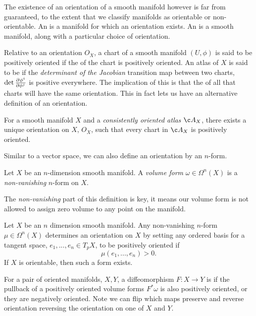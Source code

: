 The existence of an orientation of a smooth manifold however is far from guaranteed, to the extent that we classify manifolds as orientable or non-orientable.
An  is a manifold for which an orientation exists.
An  is a smooth manifold, along with a particular choice of orientation.

Relative to an orientation \(O_X\), a chart of a smooth manifold \((U, \phi)\) is said to be positively oriented if the  of the chart is positively oriented.
An atlas of \(X\) is said to be  if the \emph{determinant of the Jacobian} transition map between two charts, \(\det \pd{\phi^i}{\phi^j}\) is positive everywhere.
The implication of this is that the  of all that charts will have the same orientation.
This in fact lets us have an alternative definition of an orientation.
\begin{proposition}
	For a smooth manifold \(X\) and a \emph{consistently oriented atlas} \(\atlas{X}\), there exists a unique orientation on \(X\), \(O_X\), such that every chart in \(\atlas{X}\) is positively oriented.
\end{proposition}

Similar to a vector space, we can also define an orientation by an \(n\)-form.
\begin{definition}
	\label{def:volume_form}
	Let \(X\) be an \(n\)-dimension smooth manifold.
	A \emph{volume form} \(\omega\in \Omega^n(X)\) is a \emph{non-vanishing} \(n\)-form on \(X\).
\end{definition}
The \emph{non-vanishing} part of this definition is key, it means our volume form is not allowed to assign zero volume to any point on the manifold.
\begin{proposition}
	Let \(X\) be an \(n\) dimension smooth manifold.
	Any non-vanishing \(n\)-form \(\mu \in \Omega^n(X)\) determines an orientation on \(X\) by setting any ordered basis for a tangent space, \(e_1, ..., e_n \in T_pX\), to be positively oriented if \[\mu(e_1, ..., e_n) > 0.\]
	If \(X\) is orientable, then such a form exists.
\end{proposition}
For a pair of oriented manifolds, \(X, Y\), a diffeomorphism \(F: X\to Y\) is  if the pullback of a positively oriented volume forms \(F^*\omega\) is also positively oriented, or  they are negatively oriented. 
Note we can flip which maps preserve and reverse orientation reversing the orientation on one of \(X\) and \(Y\).

